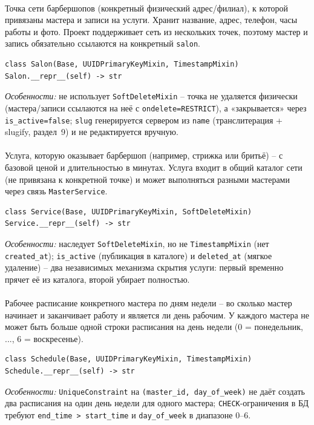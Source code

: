 \paragraph{}
Точка сети барбершопов (конкретный физический адрес/филиал), к которой
привязаны мастера и записи на услуги. Хранит название, адрес, телефон,
часы работы и фото. Проект поддерживает сеть из нескольких точек, поэтому
мастер и запись обязательно ссылаются на конкретный \texttt{salon}.
\begin{verbatim}
class Salon(Base, UUIDPrimaryKeyMixin, TimestampMixin)
Salon.__repr__(self) -> str
\end{verbatim}
\textit{Особенности:} не использует \texttt{SoftDeleteMixin} -- точка не
удаляется физически (мастера/записи ссылаются на неё с
\texttt{ondelete=RESTRICT}), а «закрывается» через \texttt{is_active=false};
\texttt{slug} генерируется сервером из \texttt{name} (транслитерация +
slugify, раздел~9) и не редактируется вручную.

\paragraph{}
Услуга, которую оказывает барбершоп (например, стрижка или бритьё) -- с
базовой ценой и длительностью в минутах. Услуга входит в общий каталог
сети (не привязана к конкретной точке) и может выполняться разными
мастерами через связь \texttt{MasterService}.
\begin{verbatim}
class Service(Base, UUIDPrimaryKeyMixin, SoftDeleteMixin)
Service.__repr__(self) -> str
\end{verbatim}
\textit{Особенности:} наследует \texttt{SoftDeleteMixin}, но не
\texttt{TimestampMixin} (нет \texttt{created_at}); \texttt{is_active}
(публикация в каталоге) и \texttt{deleted_at} (мягкое удаление) -- два
независимых механизма скрытия услуги: первый временно прячет её из
каталога, второй убирает полностью.

\paragraph{}
Рабочее расписание конкретного мастера по дням недели -- во сколько
мастер начинает и заканчивает работу и является ли день рабочим. У
каждого мастера не может быть больше одной строки расписания на день
недели (0 = понедельник, ..., 6 = воскресенье).
\begin{verbatim}
class Schedule(Base, UUIDPrimaryKeyMixin, TimestampMixin)
Schedule.__repr__(self) -> str
\end{verbatim}
\textit{Особенности:} \texttt{UniqueConstraint} на
\texttt{(master_id, day_of_week)} не даёт создать два расписания на
один день недели для одного мастера; \texttt{CHECK}-ограничения в БД
требуют \texttt{end_time > start_time} и \texttt{day_of_week} в
диапазоне 0--6.

